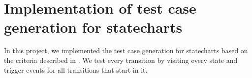 \chapter{Implementation of test case generation for statecharts}
\label{cap:testgen}


%

%

In this project, we implemented the test case generation for statecharts based on the criteria described in \cite{bogdanov}. We test every transition by visiting every state and trigger events for all transitions that start in it. 




